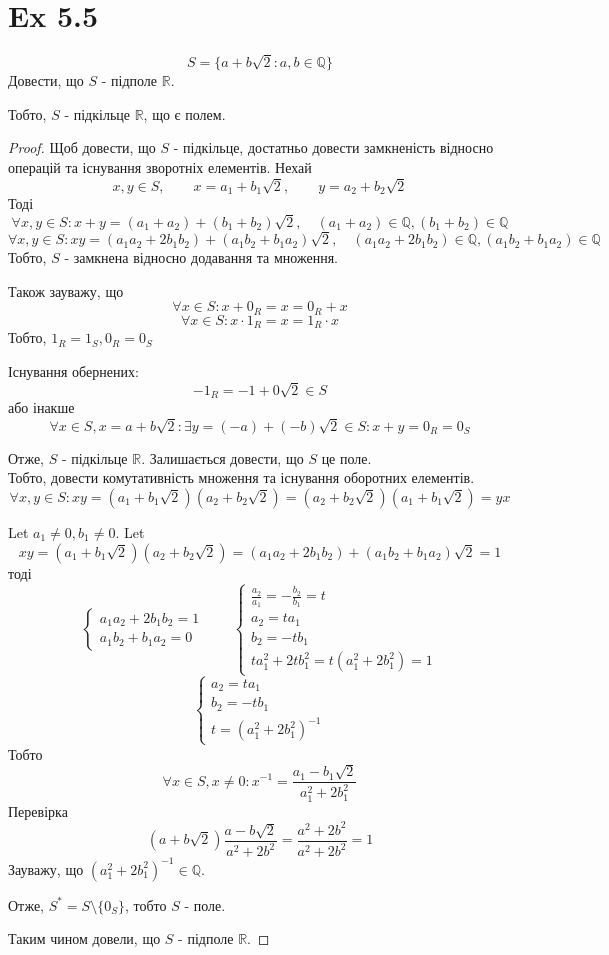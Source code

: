 \documentclass[11pt, a4paper]{article} %
\newcommand{\R}{\mathbb{R}}
\newcommand{\Q}{\mathbb{Q}}
\begin{document}
\section*{Ex 5.5}
\begin{mdframed}
    \[S = \{a+b\sqrt{2} : a,b\in \Q\}\]
    Довести, що $S$ - підполе $\R$.

    Тобто, $S$ - підкільце $\R$, що є полем.
\end{mdframed}

\begin{proof}
    Щоб довести, що $S$ - підкільце, достатньо довести замкненість відносно операцій та існування зворотніх елементів.
    Нехай
    \[x,y\in S, \qquad x=a_1 + b_1\sqrt{2}, \qquad y = a_2+b_2\sqrt{2}\]
    Тоді
    \[\forall x,y\in S: x+y = (a_1+a_2) + (b_1+b_2)\sqrt{2}, \quad (a_1+a_2)\in \Q, (b_1+b_2) \in \Q\]
    \[\forall x,y\in S: xy = (a_1a_2 + 2b_1b_2) + (a_1b_2+b_1a_2)\sqrt{2}, \quad (a_1a_2 + 2b_1b_2)\in \Q, (a_1b_2+b_1a_2) \in \Q\]
    Тобто, $S$ - замкнена відносно додавання та множення.

    Також зауважу, що 
    \[\forall x\in S: x+0_R = x = 0_R+x\]
    \[\forall x\in S: x\cdot 1_R = x = 1_R\cdot x\]
    Тобто, $1_R = 1_S, 0_R = 0_S$

    Існування обернених:
    \[-1_R = -1 + 0\sqrt{2} \in S\]
    або інакше
    \[\forall x\in S, x=a+b\sqrt{2}: \exists y = (-a)+(-b)\sqrt{2} \in S: x+y=0_R=0_S\]

    Отже, $S$ - підкільце $\R$. Залишається довести, що $S$ це поле. \\
    Тобто, довести комутативність множення та існування оборотних елементів.
    \[\forall x,y\in S: xy = (a_1+b_1\sqrt{2})(a_2+b_2\sqrt{2}) = (a_2+b_2\sqrt{2})(a_1+b_1\sqrt{2}) = yx\]

    Let $a_1\ne 0, b_1 \ne 0$. Let
    \[xy = (a_1+b_1\sqrt{2})(a_2+b_2\sqrt{2}) = (a_1a_2 + 2b_1b_2) + (a_1b_2+b_1a_2)\sqrt{2} = 1\]
    тоді
    \[\begin{cases}
        a_1a_2 + 2b_1b_2 = 1\\
        a_1b_2 + b_1a_2 = 0
    \end{cases} \qquad \begin{cases}
        \frac{a_2}{a_1} = -\frac{b_2}{b_1} = t\\
        a_2 = ta_1\\
        b_2 = -tb_1\\
        ta_1^2 + 2tb_1^2 = t(a_1^2+2b_1^2) = 1
    \end{cases}\]
    \[\begin{cases}
        a_2 = ta_1\\
        b_2 = -tb_1\\
        t = (a_1^2 + 2b_1^2)^{-1}
    \end{cases}\]
    Тобто
    \[\forall x\in S, x\ne 0: x^{-1} = \frac{a_1-b_1\sqrt{2}}{a_1^2 + 2b_1^2}\]
    Перевірка
    \[(a+b\sqrt{2})\frac{a-b\sqrt{2}}{a^2 + 2b^2} = \frac{a^2 + 2b^2}{a^2 + 2b^2} = 1\]
    Зауважу, що $(a_1^2 + 2b_1^2)^{-1} \in \Q$.

    Отже, $S^* = S \setminus \{0_S\}$, тобто $S$ - поле.

    Таким чином довели, що $S$ - підполе $\R$.
\end{proof}
\end{document}
